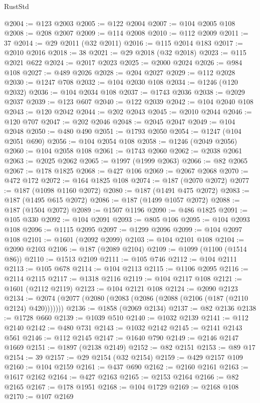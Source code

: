 \begin{lexlean}{RustStd}
\begin{coremodule}
{\begin{coremodule}
{{{{{{{{{{{{{{{{{{{{{{{{{{{{{{{{{{{{{{{{{{{{{{{{{{{{{{{@2004 := @123 @2003
@2005 := @122 @2004
@2007 := @104 @2005 @108
@2008 := @208 @2007
@2009 := @114 @2008
@2010 := @112 @2009
@2011 := 37
@2014 := @29 @2011 (@32 @2011)
@2016 := @115 @2014 @183
@2017 := @2010 @2016
@2018 := 38
@2021 := @29 @2018 (@32 @2018)
@2023 := @115 @2021 @622
@2024 := @2017 @2023
@2025 := @2000 @2024
@2026 := @984 @108
@2027 := @489 @2026
@2028 := @204 @2027
@2029 := @112 @2028
@2030 := @1247 @708
@2032 := @104 @2030 @108
@2034 := @1246 (@120 @2032)
@2036 := @104 @2034 @108
@2037 := @1743 @2036
@2038 := @2029 @2037
@2039 := @123 @607
@2040 := @122 @2039
@2042 := @104 @2040 @108
@2043 := @120 @2042
@2044 := @202 @2043
@2045 := @2010 @2044
@2046 := @120 @707
@2047 := @202 @2046
@2048 := @2045 @2047
@2049 := @104 @2048
@2050 := @480 @490
@2051 := @1793 @2050
@2054 := @1247 (@104 @2051 @690)
@2056 := @104 @2054 @108
@2058 := @1246 (@2049 @2056)
@2060 := @104 @2058 @108
@2061 := @1743 @2060
@2062 := @2038 @2061
@2063 := @2025 @2062
@2065 := @1997 (@1999 @2063)
@2066 := @82 @2065
@2067 := @178 @1825
@2068 := @427 @106
@2069 := @2067 @2068
@2070 := @472 @172
@2072 := @164 @1825 @108
@2074 := @187 (@2070 @2072)
@2077 := @187 (@1098 @1160 @2072)
@2080 := @187 (@1491 @475 @2072)
@2083 := @187 (@1495 @615 @2072)
@2086 := @187 (@1499 @1057 @2072)
@2088 := @187 (@1504 @2072)
@2089 := @1507 @1196
@2090 := @486 @1825
@2091 := @105 @330
@2092 := @104 @2091
@2093 := @805 @106
@2095 := @104 @2093 @108
@2096 := @1115 @2095
@2097 := @1299 @2096
@2099 := @104 @2097 @108
@2101 := @1601 (@2092 @2099)
@2103 := @104 @2101 @108
@2104 := @2090 @2103
@2106 := @187 (@2089 @2104)
@2109 := @1099 (@1100 (@1514 @86))
@2110 := @1513 @2109
@2111 := @105 @746
@2112 := @104 @2111
@2113 := @105 @678
@2114 := @104 @2113
@2115 := @1106 @2095
@2116 := @2114 @2115
@2117 := @1318 @2116
@2119 := @104 @2117 @108
@2121 := @1601 (@2112 @2119)
@2123 := @104 @2121 @108
@2124 := @2090 @2123
@2134 := @2074 (@2077 (@2080 (@2083 (@2086 (@2088 (@2106 (@187 (@2110 @2124) @420)))))))
@2136 := @1858 (@2069 @2134)
@2137 := @82 @2136
@2138 := @1728 @660
@2139 := @1039 @510
@2140 := @1032 @2139
@2141 := @112 @2140
@2142 := @480 @731
@2143 := @1032 @2142
@2145 := @2141 @2143 @561
@2146 := @112 @2145
@2147 := @1640 @790
@2149 := @2146 @2147 @1669
@2151 := @1897 (@2138 @2149)
@2152 := @82 @2151
@2153 := @89 @17
@2154 := 39
@2157 := @29 @2154 (@32 @2154)
@2159 := @429 @2157 @109
@2160 := @104 @2159
@2161 := @437 @690
@2162 := @2160 @2161
@2163 := @1617 @2162
@2164 := @427 @2163
@2165 := @2153 @2164
@2166 := @82 @2165
@2167 := @178 @1951
@2168 := @104 @1729
@2169 := @2168 @108
@2170 := @107 @2169
}}}}}}}}}}}}}}}}}}}}}}}}}}}}}}}}}}}}}}}}}}}}}}}}}}}}}}}
\end{coremodule}}
\end{coremodule}
\end{lexlean}
